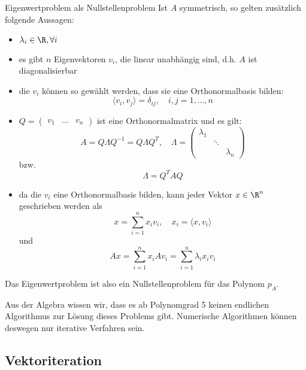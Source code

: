 \begin{bonus}{Eigenwertproblem als Nullstellenproblem}
    Ist $A$ symmetrisch, so gelten zusätzlich folgende Aussagen:
    \begin{itemize}
        \item $\lambda_i \in \R, \forall i$
        \item es gibt $n$ Eigenvektoren $v_i$, die linear unabhängig sind, d.h. $A$ ist diagonalisierbar
        \item die $v_i$ können so gewählt werden, dass sie eine Orthonormalbasis bilden:
              \[
                  \langle v_i, v_j \rangle = \delta_{ij}, \quad i, j = 1, \ldots, n
              \]
        \item $Q = \begin{pmatrix}
                      v_1 & \ldots & v_n
                  \end{pmatrix}$ ist eine Orthonormalmatrix und es gilt:
              \[
                  A = Q \Lambda Q^{-1} = Q \Lambda Q^{T}, \quad \Lambda = \begin{pmatrix}
                      \lambda_1 &        &           \\
                                & \ddots &           \\
                                &        & \lambda_n
                  \end{pmatrix}
              \]
              bzw.
              \[
                  \Lambda = Q^T A Q
              \]
        \item da die $v_i$ eine Orthonormalbasis bilden, kann jeder Vektor $x \in \R^n$ geschrieben werden als
              \[
                  x = \sum_{i=1}^{n} x_i v_i, \quad x_i = \langle x, v_i \rangle
              \]
              und
              \[
                  Ax = \sum_{i=1}^{n} x_i A v_i = \sum_{i=1}^{n} \lambda_i x_i v_i
              \]
    \end{itemize}

    Das Eigenwertproblem ist also ein Nullstellenproblem für das Polynom $p_A$.

    Aus der Algebra wissen wir, dass es ab Polynomgrad 5 keinen endlichen Algorithmus zur Lösung dieses Problems gibt.
    Numerische Algorithmen können deswegen nur iterative Verfahren sein.
\end{bonus}

\subsection{Vektoriteration}

